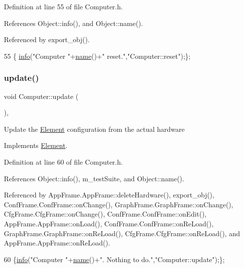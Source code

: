 Definition at line 55 of file Computer.\+h.



References Object\+::info(), and Object\+::name().



Referenced by export\+\_\+obj().


\begin{DoxyCode}
55 \{ \hyperlink{classObject_a644fd329ea4cb85f54fa6846484b84a8}{info}(\textcolor{stringliteral}{"Computer "}+\hyperlink{classObject_a300f4c05dd468c7bb8b3c968868443c1}{name}()+\textcolor{stringliteral}{" reset."},\textcolor{stringliteral}{"Computer::reset"});\};
\end{DoxyCode}
\mbox{\label{classComputer_aaad6dfbfcc6843d73f49e0fc1535563e}} 
\subsubsection{\texorpdfstring{update()}{update()}}
{\footnotesize\ttfamily void Computer\+::update (\begin{DoxyParamCaption}{ }\end{DoxyParamCaption})\hspace{0.3cm}{\ttfamily [inline]}, {\ttfamily [virtual]}}

Update the \hyperlink{classElement}{Element} configuration from the actual hardware 

Implements \hyperlink{classElement_a4e6c83efae95616ebddd03c793a26661}{Element}.



Definition at line 60 of file Computer.\+h.



References Object\+::info(), m\+\_\+test\+Suite, and Object\+::name().



Referenced by App\+Frame.\+App\+Frame\+::delete\+Hardware(), export\+\_\+obj(), Conf\+Frame.\+Conf\+Frame\+::on\+Change(), Graph\+Frame.\+Graph\+Frame\+::on\+Change(), Cfg\+Frame.\+Cfg\+Frame\+::on\+Change(), Conf\+Frame.\+Conf\+Frame\+::on\+Edit(), App\+Frame.\+App\+Frame\+::on\+Load(), Conf\+Frame.\+Conf\+Frame\+::on\+Re\+Load(), Graph\+Frame.\+Graph\+Frame\+::on\+Re\+Load(), Cfg\+Frame.\+Cfg\+Frame\+::on\+Re\+Load(), and App\+Frame.\+App\+Frame\+::on\+Re\+Load().


\begin{DoxyCode}
60 \{\hyperlink{classObject_a644fd329ea4cb85f54fa6846484b84a8}{info}(\textcolor{stringliteral}{"Computer "}+\hyperlink{classObject_a300f4c05dd468c7bb8b3c968868443c1}{name}()+\textcolor{stringliteral}{". Nothing to do."},\textcolor{stringliteral}{"Computer::update"});\};
\end{DoxyCode}


